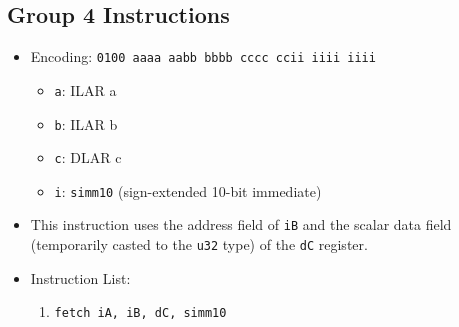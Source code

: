 \documentclass{article}
\begin{document}
	\subsection{Group 4 Instructions}
		\begin{itemize}
		\item Encoding:  \texttt{0100 aaaa aabb bbbb  cccc ccii iiii iiii}
			\begin{itemize}
			\item \texttt{a}:  ILAR a
			\item \texttt{b}:  ILAR b
			\item \texttt{c}:  DLAR c
			\item \texttt{i}:  \texttt{simm10} (sign-extended 10-bit
			immediate)
			\end{itemize}

		\item This instruction uses the address field of \texttt{iB} and
		the scalar data field (temporarily casted to the \texttt{u32} type)
		of the \texttt{dC} register.

		\item Instruction List:
			\begin{enumerate}
			\item \texttt{fetch iA, iB, dC, simm10}
			\end{enumerate}
		\end{itemize}
		\newpage
\end{document}
